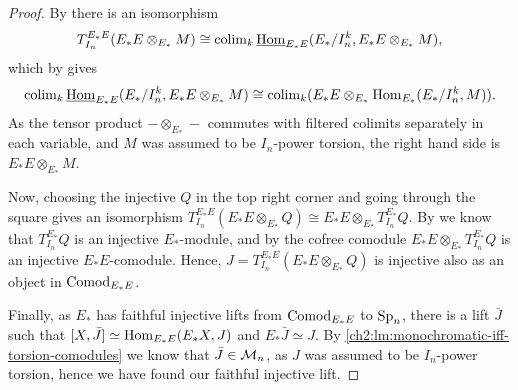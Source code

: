 \begin{proof}
    By \cite[5.5]{barthel-heard-valenzuela_2018} there is an isomorphism
    \[T^{E_*E}_{I_n} (E_*E\otimes_{E_*}M) \cong \operatorname{colim}_k \operatorname{\underline{Hom}}_{E_*E}(E_*/I_n^k, E_*E\otimes_{E_*}M),\]
    which by \cite[4.4]{barthel-heard-valenzuela_2018} gives
    \[\operatorname{colim}_k \operatorname{\underline{Hom}}_{E_*E}(E_*/I_n^k, E_*E\otimes_{E_*}M) \cong \operatorname{colim}_k (E_*E \otimes_{E_*} \operatorname{Hom}_{E_*}(E_*/I_n^k, M)).\]
    As the tensor product $-\otimes_{E_*}-$ commutes with filtered colimits separately in each variable, and $M$ was assumed to be $I_n$-power torsion, the right hand side is $E_*E\otimes_{E_*}M$.    
    
    Now, choosing the injective $Q$ in the top right corner and going through the square gives an isomorphism $T^{E_*E}_{I_n}(E_*E\otimes_{E_*}Q)\cong E_*E\otimes_{E_*}T_{I_n}^{E_*}Q$. By \cite[2.1.4]{brodmann-sharp_1998} we know that $T^{E_*}_{I_n}Q$ is an injective $E_*$-module, and by \cite[2.1(a)]{hovey-strickland_2005b} the cofree comodule $E_*E\otimes_{E_*} T^{E_*}_{I_n}Q$ is an injective $E_*E$-comodule. Hence, $J=T^{E_*E}_{I_n}(E_*E\otimes_{E_*}Q)$ is injective also as an object in $\mathrm{Comod}_{E_*E}$.

    Finally, as $E_*$ has faithful injective lifts from $\mathrm{Comod}_{E_*E}$ to $\mathrm{Sp}_{n}$, there is a lift $\bar{J}$ such that $[X,\bar{J}]\simeq \operatorname{Hom}_{E_*E}(E_*X, J)$ and $E_*\bar{J}\simeq J$. By \cref{ch2:lm:monochromatic-iff-torsion-comodules} we know that $\bar{J}\in \mathcal{M}_{n}$, as $J$ was assumed to be $I_n$-power torsion, hence we have found our faithful injective lift. 
\end{proof}

